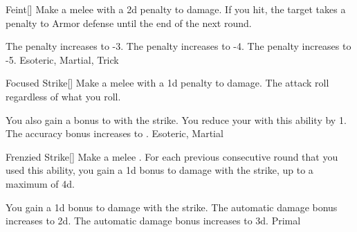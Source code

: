 \lowercase{\hypertarget{maneuver:Feint}{}}\label{maneuver:Feint}
\hypertarget{maneuver:Feint}{}
\begin{freeability}[Rank 1]{Feint}[]
Make a melee  with a \minus2d penalty to damage.
If you hit, the target takes a  penalty to Armor defense until the end of the next round.

\rankline
{} The penalty increases to -3.
 The penalty increases to -4.
 The penalty increases to -5.
 Esoteric, Martial, Trick
\end{freeability}
\vspace{0.25em}



\lowercase{\hypertarget{maneuver:Focused Strike}{}}\label{maneuver:Focused Strike}
\hypertarget{maneuver:Focused Strike}{}
\begin{freeability}[Rank 1]{Focused Strike}[]
Make a melee  with a \minus1d penalty to damage.
The attack roll  regardless of what you roll.

\rankline
{} You also gain a  bonus to  with the strike.
 You reduce your  with this ability by 1.
 The accuracy bonus increases to .
 Esoteric, Martial
\end{freeability}
\vspace{0.25em}



\lowercase{\hypertarget{maneuver:Frenzied Strike}{}}\label{maneuver:Frenzied Strike}
\hypertarget{maneuver:Frenzied Strike}{}
\begin{freeability}[Rank 1]{Frenzied Strike}[]
Make a melee .
For each previous consecutive round that you used this ability, you gain a \plus1d bonus to damage with the strike, up to a maximum of \plus4d.

\rankline
{} You gain a \plus1d bonus to damage with the strike.
 The automatic damage bonus increases to \plus2d.
 The automatic damage bonus increases to \plus3d.
 Primal
\end{freeability}
\vspace{0.25em}



